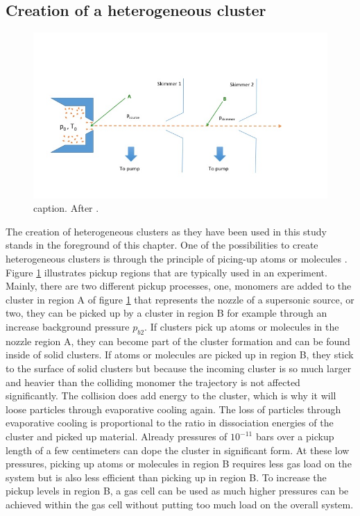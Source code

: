 \subsection{Creation of a heterogeneous cluster}
\begin{figure}
	\centering
		\includegraphics[width=1.00\textwidth]{images/pick-up.jpg}
	\caption{caption. After \cite{Haberland-1994-Springer}.}
	\label{fig:pickupPrinciple}
\end{figure}

The creation of heterogeneous clusters as they have been used in this study stands in the foreground of this chapter. One of the possibilities to create heterogeneous clusters is through the principle of picing-up atoms or molecules \cite{Haberland-1994-Springer}. Figure \ref{fig:pickupPrinciple} illustrates pickup regions that are typically used in an experiment. Mainly, there are two different pickup processes, one, monomers are added to the cluster in region A of figure \ref{fig:pickupPrinciple} that represents the nozzle of a supersonic source, or two, they can be picked up by a cluster in region B for example through an increase background pressure $p_{b2}$. If clusters pick up atoms or molecules in the nozzle region A, they can become part of the cluster formation and can be found inside of solid clusters. If atoms or molecules are picked up in region B, they stick to the surface of solid clusters but because the incoming cluster is so much larger and heavier than the colliding monomer the trajectory is not affected significantly. The collision does add energy to the cluster, which is why it will loose particles through evaporative cooling again. The loss of particles through evaporative cooling is proportional to the ratio in dissociation energies of the cluster and picked up material. Already pressures of $10^{-11}$ bars over a pickup length of a few centimeters can dope the cluster in significant form. At these low pressures, picking up atoms or molecules in region B requires less gas load on the system but is also less efficient than picking up in region B. To increase the pickup levels in region B, a gas cell can be used as much higher pressures can be achieved within the gas cell without putting too much load on the overall system.
